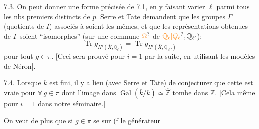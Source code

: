 7.3. On peut donner une forme précisée de 7.1, en y faisant varier $\ell$ parmi tous les nbs premiers distincts de $p$. Serre et Tate  demandent que les  groupes $\Gamma$  (quotients de $I$) associés à   soient les mêmes, et que les représentations obtenues de $\Gamma$ soient ``isomorphes'' (sur une  commune $\unsure{\Omega}$ de $\unsure{\mathbb Q_\ell|Q_\ell},\mathbb Q_{\ell'}$);    
 
\[
 \operatorname{Tr}g_{H^i(\overline X,\mathbb Q_\ell)}
 =\operatorname{Tr}g_{H^i(\overline X,\mathbb Q_{\ell'})}
 \tag*{(7.3.1)}
\]
pour tout $g\in\pi$. [Ceci sera prouvé pour $i=1$ par la suite, en utilisant les modèles de Néron]. 

7.4. Lorsque $k$ est fini,  il y a lieu (avec Serre et Tate) de conjecturer que cette   est vraie  pour $\forall\,g\in\pi$ dont l'image dans $\operatorname{Gal}(\overline k/k)\simeq\widehat{\mathbb Z}$ tombe dans $\mathbb Z$. [Cela même   pour $i=1$ dans notre séminaire.]

On veut de plus que si $g\in\pi$ se  sur   (f le générateur


